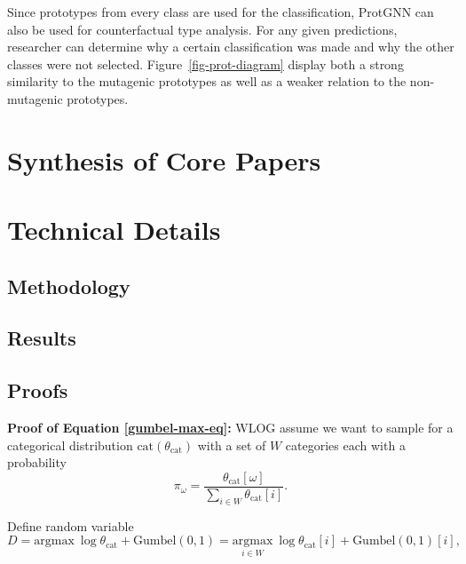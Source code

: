 \documentclass[
  11pt,
  letterpaper,
]{article}
\begin{document}
Since prototypes from every class are used for the classification,
ProtGNN can also be used for counterfactual type analysis. For any given
predictions, researcher can determine why a certain classification was
made and why the other classes were not selected.
Figure~\ref{fig-prot-diagram} display both a strong similarity to the
mutagenic prototypes as well as a weaker relation to the non-mutagenic
prototypes.

\hypertarget{synthesis-of-core-papers}{%
\section{Synthesis of Core Papers}\label{synthesis-of-core-papers}}

\hypertarget{technical-details}{%
\section{Technical Details}\label{technical-details}}

\hypertarget{methodology}{%
\subsection{Methodology}\label{methodology}}

\hypertarget{results}{%
\subsection{Results}\label{results}}

\hypertarget{sec-proof}{%
\subsection{Proofs}\label{sec-proof}}

\textbf{Proof of Equation \ref{gumbel-max-eq}:} WLOG assume we want to
sample for a categorical distribution \(\text{cat}(\theta_\text{cat})\)
with a set of \(W\) categories each with a probability \[
\pi_\omega = \dfrac{\theta_\text{cat}[\omega]}{\sum_{i \in W}\theta_\text{cat}[i]}.
\]

Define random variable \[
D = \text{argmax} \ \log \theta_\text{cat} + \text{Gumbel}(0, 1) = \underset{i \in W}{\text{argmax}} \ \log \theta_\text{cat}[i] + \text{Gumbel}(0, 1)[i], 
\]
\end{document}
